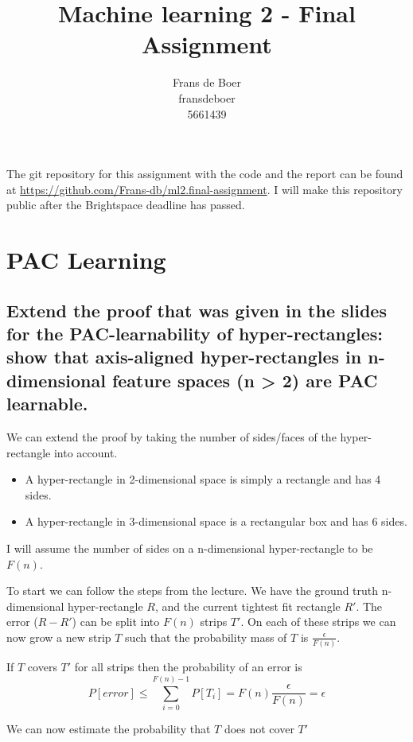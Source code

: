 \documentclass[11pt,a4paper]{article}
\title{Machine learning 2 - Final Assignment}
\author{
    Frans de Boer \\
    fransdeboer \\
    5661439 \\
}
\begin{document}
\maketitle

The git repository for this assignment with the code and the report can be found at \url{https://github.com/Frans-db/ml2.final-assignment}. I will make this repository public after the Brightspace deadline has passed.

\section{PAC Learning}

\subsection{Extend the proof that was given in the slides for the PAC-learnability of hyper-rectangles:
show that axis-aligned hyper-rectangles in n-dimensional feature spaces (n > 2) are PAC
learnable.}
\label{sec:2a}
  
We can extend the proof by taking the number of sides/faces of the hyper-rectangle into account.
\begin{itemize}
    \item A hyper-rectangle in 2-dimensional space is simply a rectangle and has 4 sides.
    \item A hyper-rectangle in 3-dimensional space is a rectangular box and has 6 sides.
\end{itemize}
I will assume the number of sides on a n-dimensional hyper-rectangle to be $F(n)$.

To start we can follow the steps from the lecture. We have the ground truth n-dimensional hyper-rectangle $R$, and the current tightest fit rectangle $R'$. The error ($R - R'$) can be split into $F(n)$ strips $T'$. On each of these strips we can now grow a new strip $T$ such that the probability mass of $T$ is $\frac{\epsilon}{F(n)}$.

If $T$ covers $T'$ for all strips then the probability of an error is
\begin{equation}
    \label{eq:total_error}
    P[error] \leq \sum_{i=0}^{F(n)-1}P[T_i] = F(n)\frac{\epsilon}{F(n)} = \epsilon
\end{equation}

We can now estimate the probability that $T$ does not cover $T'$
\end{document}
